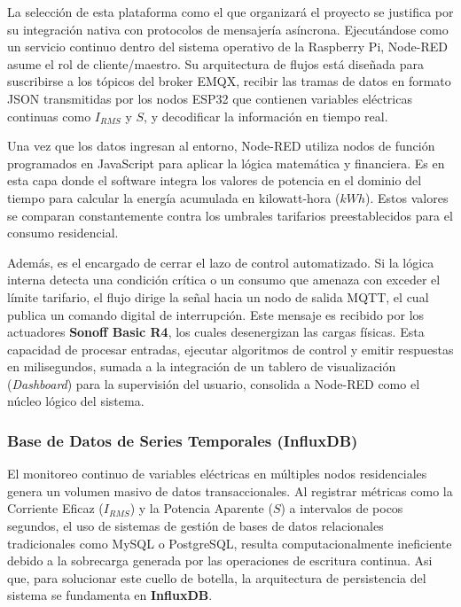             La selección de esta plataforma como el que organizará el proyecto se justifica por su integración nativa con protocolos de mensajería asíncrona. Ejecutándose como un servicio continuo dentro del sistema operativo de la Raspberry Pi, Node-RED asume el rol de cliente/maestro. Su arquitectura de flujos está diseñada para suscribirse a los tópicos del broker EMQX, recibir las tramas de datos en formato JSON transmitidas por los nodos ESP32 que contienen variables eléctricas continuas como $I_{RMS}$ y $S$, y decodificar la información en tiempo real.

            Una vez que los datos ingresan al entorno, Node-RED utiliza nodos de función programados en JavaScript para aplicar la lógica matemática y financiera. Es en esta capa donde el software integra los valores de potencia en el dominio del tiempo para calcular la energía acumulada en kilowatt-hora ($kWh$). Estos valores se comparan constantemente contra los umbrales tarifarios preestablecidos para el consumo residencial.

            Además, es el encargado de cerrar el lazo de control automatizado. Si la lógica interna detecta una condición crítica o un consumo que amenaza con exceder el límite tarifario, el flujo dirige la señal hacia un nodo de salida MQTT, el cual publica un comando digital de interrupción. Este mensaje es recibido por los actuadores \textbf{Sonoff Basic R4}, los cuales desenergizan las cargas físicas. Esta capacidad de procesar entradas, ejecutar algoritmos de control y emitir respuestas en milisegundos, sumada a la integración de un tablero de visualización (\textit{Dashboard}) para la supervisión del usuario, consolida a Node-RED como el núcleo lógico del sistema.

        \subsubsection{Base de Datos de Series Temporales (InfluxDB)}

            El monitoreo continuo de variables eléctricas en múltiples nodos residenciales genera un volumen masivo de datos transaccionales. Al registrar métricas como la Corriente Eficaz ($I_{RMS}$) y la Potencia Aparente ($S$) a intervalos de pocos segundos, el uso de sistemas de gestión de bases de datos relacionales tradicionales como MySQL o PostgreSQL, resulta computacionalmente ineficiente debido a la sobrecarga generada por las operaciones de escritura continua. Asi que, para solucionar este cuello de botella, la arquitectura de persistencia del sistema se fundamenta en \textbf{InfluxDB}.


